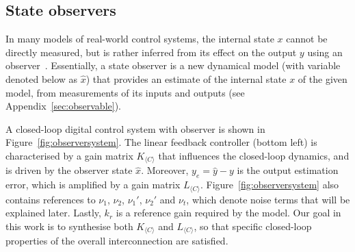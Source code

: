 \documentclass[sigconf]{llncs}
\newcommand{\mat}[1]{{#1}}
\renewcommand{\vec}[1]{{#1}}
\begin{document}
\subsection{State observers}\label{sec:observer}

In many models of real-world control systems, 
the internal state $x$ cannot be directly measured,  
but is rather inferred from its effect on the output $\vec{y}$ using an observer~\cite{Astrom08}.  
Essentially, a state observer is a new dynamical model (with variable denoted below as $\hat{\vec{x}}$) 
that provides an estimate of the internal state $x$ of the given model, 
from measurements of its inputs and outputs (see Appendix~\ref{sec:observable}). 

A closed-loop digital control system with observer is shown in Figure~\ref{fig:observersystem}. 
The linear feedback controller (bottom left) is characterised by a gain matrix $\mat{K}_{\langle C \rangle}$ that influences the closed-loop dynamics, 
and is driven by the observer state $\hat{\vec{x}}$.  
Moreover, $\vec{y}_e=\hat{\vec{y}} - \vec{y}$ is the output estimation error,  
 which is amplified by a gain matrix $\mat{L}_{\langle C \rangle}$. 
Figure~\ref{fig:observersystem} also contains references to $\nu_1$, $\nu_2$, $\nu_1'$, $\nu_2'$ and $\nu_t$, which
  denote noise terms that will be explained later.   
  Lastly, $k_r$ is a reference gain required by the model.  
  Our goal in this work is to synthesise both $\mat{K}_{\langle C \rangle}$ and $\mat{L}_{\langle C \rangle}$, 
  so that specific closed-loop properties of the overall interconnection are satisfied.
 
\end{document}
